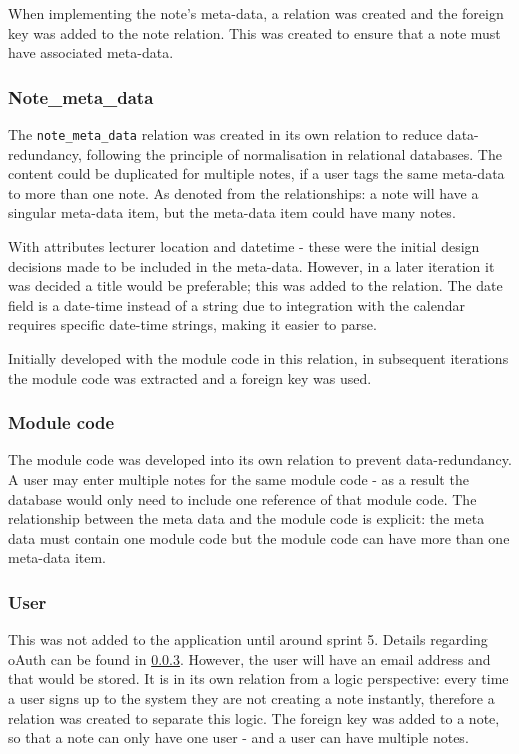 When implementing the note's meta-data, a relation was created and the foreign key was added to the note relation. This was created to ensure that a note must have associated meta-data.

\subsubsection{Note_meta_data}
The \texttt{note_meta_data} relation was created in its own relation to reduce data-redundancy, following the principle of normalisation in relational databases. The content could be duplicated for multiple notes, if a user tags the same meta-data to more than one note. As denoted from the relationships: a note will have a singular meta-data item, but the meta-data item could have many notes.

With attributes lecturer location and datetime - these were the initial design decisions made to be included in the meta-data. However, in a later iteration it was decided a title would be preferable; this was added to the relation. The date field is a date-time instead of a string due to integration with the calendar requires specific date-time strings, making it easier to parse.

Initially developed with the module code in this relation, in subsequent iterations the module code was extracted and a foreign key was used.

\subsubsection{Module code}
The module code was developed into its own relation to prevent data-redundancy. A user may enter multiple notes for the same module code - as a result the database would only need to include one reference of that module code. The relationship between the meta data and the module code is explicit: the meta data must contain one module code but the module code can have more than one meta-data item.

\subsubsection{User}
This was not added to the application until around sprint 5. Details regarding oAuth can be found in \ref{}. However, the user will have an email address and that would be stored. It is in its own relation from a logic perspective: every time a user signs up to the system they are not creating a note instantly, therefore a relation was created to separate this logic. The foreign key was added to a note, so that a note can only have one user - and a user can have multiple notes.


